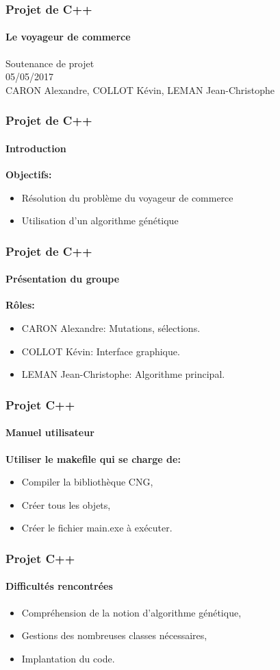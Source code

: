 \documentclass{beamer}
\begin{document}
	\begin{frame}
	\frametitle{Projet de C++}
	\framesubtitle{Le voyageur de commerce}
		\begin{center}
			Soutenance de projet\\
			05/05/2017\\
			CARON Alexandre, COLLOT Kévin, LEMAN Jean-Christophe
		\end{center}	
	\end{frame}

	\begin{frame}
	\frametitle{Projet de C++}
	\framesubtitle{Introduction}
		\textbf{Objectifs:}
		\begin{itemize}
		\item Résolution du problème du voyageur de commerce
		\item Utilisation d'un algorithme génétique
		\end{itemize}
	\end{frame}

	\begin{frame}
	\frametitle{Projet de C++}
	\framesubtitle{Présentation du groupe}
		\textbf{Rôles:}	
		\begin{itemize}
		\item CARON Alexandre: Mutations, sélections.
		\item COLLOT Kévin: Interface graphique.
		\item LEMAN Jean-Christophe: Algorithme principal.
		\end{itemize}
	\end{frame}
	
	\begin{frame}
	\frametitle{Projet C++}
	\framesubtitle{Manuel utilisateur}
		\textbf{Utiliser le makefile qui se charge de:}
		\begin{itemize}
		\item Compiler la bibliothèque CNG,
		\item Créer tous les objets,
		\item Créer le fichier main.exe à exécuter.
		\end{itemize}
	\end{frame}

	\begin{frame}
	\frametitle{Projet C++}
	\framesubtitle{Difficultés rencontrées}	
		\begin{itemize}
		\item Compréhension de la notion d'algorithme génétique,
		\item Gestions des nombreuses classes nécessaires,
		\item Implantation du code.
		\end{itemize}
	\end{frame}
	
\end{document}
